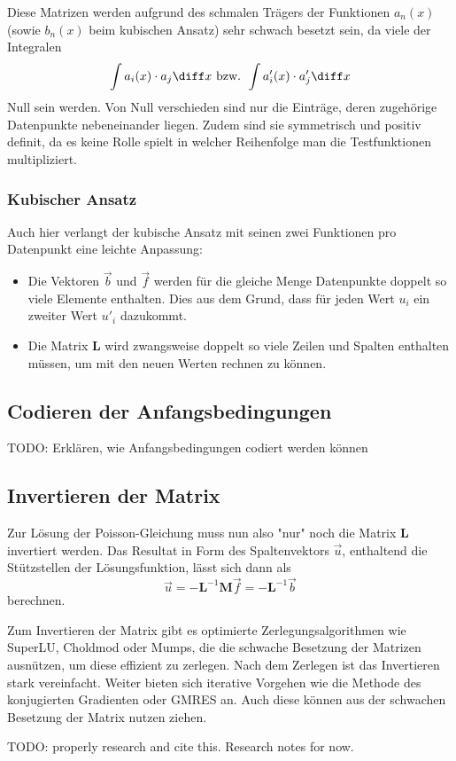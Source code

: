 Diese Matrizen werden aufgrund des schmalen Trägers der Funktionen $a_n(x)$ (sowie $b_n(x)$ beim kubischen Ansatz) sehr schwach besetzt sein, da viele der Integralen
\begin{equation}
    \int a_i(x) \cdot a_j \diff x \text{ bzw. } \int a'_i(x) \cdot a'_j \diff x 
\end{equation}
Null sein werden.
Von Null verschieden sind nur die Einträge, deren zugehörige Datenpunkte nebeneinander liegen.
Zudem sind sie symmetrisch und positiv definit, da es keine Rolle spielt in welcher Reihenfolge man die Testfunktionen multipliziert.

\subsubsection{Kubischer Ansatz}
Auch hier verlangt der kubische Ansatz mit seinen zwei Funktionen pro Datenpunkt eine leichte Anpassung: 
\begin{itemize}
    \item Die Vektoren $\vec{b}$ und $\vec{f}$ werden für die gleiche Menge Datenpunkte doppelt so viele Elemente enthalten.
          Dies aus dem Grund, dass für jeden Wert $u_i$ ein zweiter Wert $u'_i$ dazukommt.
    \item Die Matrix $\mathbf{L}$ wird zwangsweise doppelt so viele Zeilen und Spalten enthalten müssen, um mit den neuen Werten rechnen zu können. %
\end{itemize}


\subsection{Codieren der Anfangsbedingungen}
TODO: Erklären, wie Anfangsbedingungen codiert werden können


\subsection{Invertieren der Matrix\label{fem:1d:invertieren_matrix}}
Zur Lösung der Poisson-Gleichung muss nun also "nur" noch die Matrix $\mathbf{L}$ invertiert werden.
Das Resultat in Form des Spaltenvektors $\vec{u}$, enthaltend die Stützstellen der Lösungsfunktion, lässt sich dann als
\begin{equation}
    \vec{u} = - \mathbf{L}^{-1}\mathbf{M}\vec{f} = - \mathbf{L}^{-1}\vec{b}
\end{equation}
berechnen.

Zum Invertieren der Matrix gibt es optimierte Zerlegungsalgorithmen wie SuperLU, Choldmod oder Mumps, die die schwache Besetzung der Matrizen ausnützen, um diese effizient zu zerlegen.
Nach dem Zerlegen ist das Invertieren stark vereinfacht.
Weiter bieten sich iterative Vorgehen wie die Methode des konjugierten Gradienten oder GMRES an.
Auch diese können aus der schwachen Besetzung der Matrix nutzen ziehen.

TODO: properly research and cite this. Research notes for now.
